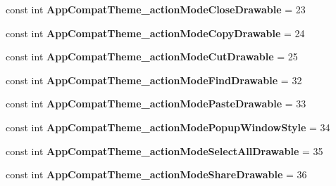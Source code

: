 \begin{DoxyCompactItemize}
\mbox{\label{classst_delivery_1_1_resource_1_1_styleable_a6f37185c3c4765fd9c6dc00666a92a38}} 
const int {\bfseries App\+Compat\+Theme\+\_\+action\+Mode\+Close\+Drawable} = 23
\item 
\mbox{\label{classst_delivery_1_1_resource_1_1_styleable_a77af91e8cd445f48cb7d7beec597ff5d}} 
const int {\bfseries App\+Compat\+Theme\+\_\+action\+Mode\+Copy\+Drawable} = 24
\item 
\mbox{\label{classst_delivery_1_1_resource_1_1_styleable_abd37c667faa7b66942b64c8010574598}} 
const int {\bfseries App\+Compat\+Theme\+\_\+action\+Mode\+Cut\+Drawable} = 25
\item 
\mbox{\label{classst_delivery_1_1_resource_1_1_styleable_a35e3de9b50910d62377616240575a1f8}} 
const int {\bfseries App\+Compat\+Theme\+\_\+action\+Mode\+Find\+Drawable} = 32
\item 
\mbox{\label{classst_delivery_1_1_resource_1_1_styleable_aa7335e012192f326424dd5f85b6cf27c}} 
const int {\bfseries App\+Compat\+Theme\+\_\+action\+Mode\+Paste\+Drawable} = 33
\item 
\mbox{\label{classst_delivery_1_1_resource_1_1_styleable_aa4d517fbf83dd1c0a43fa50a2b4a3b0c}} 
const int {\bfseries App\+Compat\+Theme\+\_\+action\+Mode\+Popup\+Window\+Style} = 34
\item 
\mbox{\label{classst_delivery_1_1_resource_1_1_styleable_ad91628a0c4f83a663ee9e72e47a64a91}} 
const int {\bfseries App\+Compat\+Theme\+\_\+action\+Mode\+Select\+All\+Drawable} = 35
\item 
\mbox{\label{classst_delivery_1_1_resource_1_1_styleable_a9323ced3942431bc7dbf6d5ebb7561b0}} 
const int {\bfseries App\+Compat\+Theme\+\_\+action\+Mode\+Share\+Drawable} = 36
\item 
\mbox{\label{classst_delivery_1_1_resource_1_1_styleable_a24380be7ba6d48744165760992cca806}} 

\end{DoxyCompactItemize}

